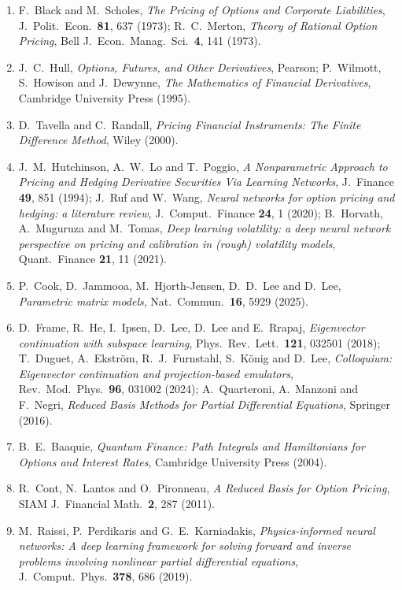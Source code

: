 \documentclass[12pt,a4paper]{article}
\begin{document}
\begin{enumerate}
    \item F.~Black and M.~Scholes, \textit{The Pricing of Options and Corporate Liabilities}, J.\ Polit.\ Econ.\ \textbf{81}, 637 (1973); R.~C.~Merton, \textit{Theory of Rational Option Pricing}, Bell J.\ Econ.\ Manag.\ Sci.\ \textbf{4}, 141 (1973).
    \item J.~C.~Hull, \textit{Options, Futures, and Other Derivatives}, Pearson; P.~Wilmott, S.~Howison and J.~Dewynne, \textit{The Mathematics of Financial Derivatives}, Cambridge University Press (1995).
    \item D.~Tavella and C.~Randall, \textit{Pricing Financial Instruments: The Finite Difference Method}, Wiley (2000).
    \item J.~M.~Hutchinson, A.~W.~Lo and T.~Poggio, \textit{A Nonparametric Approach to Pricing and Hedging Derivative Securities Via Learning Networks}, J.\ Finance \textbf{49}, 851 (1994); J.~Ruf and W.~Wang, \textit{Neural networks for option pricing and hedging: a literature review}, J.\ Comput.\ Finance \textbf{24}, 1 (2020); B.~Horvath, A.~Muguruza and M.~Tomas, \textit{Deep learning volatility: a deep neural network perspective on pricing and calibration in (rough) volatility models}, Quant.\ Finance \textbf{21}, 11 (2021).
    \item P.~Cook, D.~Jammooa, M.~Hjorth-Jensen, D.~D.~Lee and D.~Lee, \textit{Parametric matrix models}, Nat.\ Commun.\ \textbf{16}, 5929 (2025).
    \item D.~Frame, R.~He, I.~Ipsen, D.~Lee, D.~Lee and E.~Rrapaj, \textit{Eigenvector continuation with subspace learning}, Phys.\ Rev.\ Lett.\ \textbf{121}, 032501 (2018); T.~Duguet, A.~Ekstr\"om, R.~J.~Furnstahl, S.~K\"onig and D.~Lee, \textit{Colloquium: Eigenvector continuation and projection-based emulators}, Rev.\ Mod.\ Phys.\ \textbf{96}, 031002 (2024); A.~Quarteroni, A.~Manzoni and F.~Negri, \textit{Reduced Basis Methods for Partial Differential Equations}, Springer (2016).
    \item B.~E.~Baaquie, \textit{Quantum Finance: Path Integrals and Hamiltonians for Options and Interest Rates}, Cambridge University Press (2004).
    \item R.~Cont, N.~Lantos and O.~Pironneau, \textit{A Reduced Basis for Option Pricing}, SIAM J.\ Financial Math.\ \textbf{2}, 287 (2011).
    \item M.~Raissi, P.~Perdikaris and G.~E.~Karniadakis, \textit{Physics-informed neural networks: A deep learning framework for solving forward and inverse problems involving nonlinear partial differential equations}, J.\ Comput.\ Phys.\ \textbf{378}, 686 (2019).

\end{enumerate}
\end{document}
